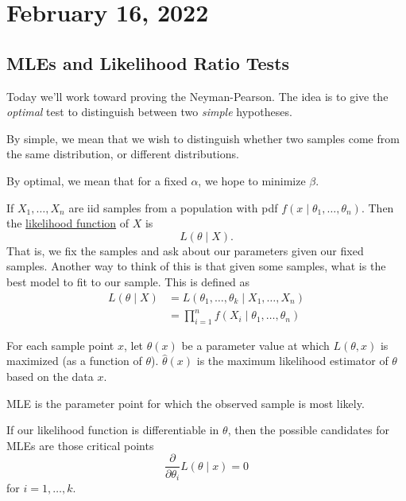 \section{February 16, 2022}

\subsection{MLEs and Likelihood Ratio Tests}
Today we'll work toward proving the Neyman-Pearson. The idea is to give the \emph{optimal} test to distinguish between two \emph{simple} hypotheses.

By simple, we mean that we wish to distinguish whether two samples come from the same distribution, or different distributions.

By optimal, we mean that for a fixed $\alpha$, we hope to minimize $\beta$.

\begin{definition}
    If $X_1, \dots, X_n$ are iid samples from a population with pdf $f(x\mid \theta_1, \dots, \theta_n)$. Then the \ul{likelihood function} of $X$ is
    \[L(\theta\mid X).\]
    That is, we fix the samples and ask about our parameters given our fixed samples. Another way to think of this is that given some samples, what is the best model to fit to our sample. This is defined as
    \begin{align*}
        L(\theta\mid X)
         & = L(\theta_1, \dots, \theta_k\mid X_1, \dots, X_n)   \\
         & = \prod_{i=1}^n f(X_i\mid \theta_1, \dots, \theta_n)
    \end{align*}
\end{definition}

\begin{definition}
    For each sample point $x$, let $\hat{\theta}(x)$ be a parameter value at which $L(\theta, x)$ is maximized (as a function of $\theta$). $\hat{\theta}(x)$ is the maximum likelihood estimator of $\theta$ based on the data $x$.
\end{definition}
MLE is the parameter point for which the observed sample is most likely.

If our likelihood function is differentiable in $\theta$, then the possible candidates for MLEs are those critical points
\[\frac{\partial}{\partial \theta_i}L(\theta\mid x) = 0\]
for $i = 1,\dots, k$.

